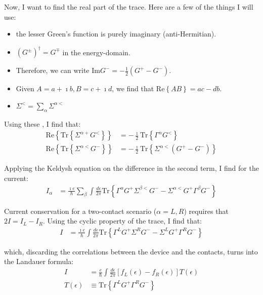 Now, I want to find the real part of the trace. Here are a few of the things I will use:
\begin{itemize}
\item the lesser Green's function is purely imaginary (anti-Hermitian). 
\item $(G^\pm)^\dagger = G^\mp$ in the energy-domain.
\item Therefore, we can write $\text{Im} G^- = - \frac{1}{2} \left( G^+ - G^- \right)$.
\item Given $A=a+\imath b, B = c + \imath d$, we find that $\text{Re}\left\{ AB \right\} = ac - db$.
\item $\Sigma^< = \sum_\alpha \Sigma^{\alpha<}$
\end{itemize}

Using these , I find that:
\begin{align*}
\text{Re}\left\{\text{Tr}\left\{ \Sigma^{\alpha+} G^<\right\}\right\} &= - \frac{\imath}{2} \text{Tr}\left\{ \Gamma^\alpha G^< \right\} \\
\text{Re}\left\{\text{Tr}\left\{ \Sigma^{\alpha<} G^-\right\}\right\} &= - \frac{\imath}{2} \text{Tr}\left\{\Sigma^{\alpha<} \left(G^+ - G^-\right)\right\}
\end{align*}

Applying the Keldysh equation on the difference in the second term, I find for the current:
\begin{align*}
I_\alpha &= \frac{\imath e}{\hbar} \sum_\beta \int \frac{d\epsilon}{2\pi} \text{Tr}\left\{ \Gamma^\alpha G^+ \Sigma^{\beta <}G^- - \Sigma^{\alpha<}G^+\Gamma^\beta G^- \right\}
\end{align*}

Current conservation for a two-contact scenario ($\alpha=L,R$) requires that $2 I = I_L - I_R$. Using the cyclic property of the trace, I find that:
\begin{align*}
I &= \frac{\imath e}{\hbar} \int \frac{d\epsilon}{2\pi} \text{Tr}\left\{ \Gamma^L G^+ \Sigma^R G^- - \Sigma^L G^+ \Gamma^R G^-\right\}
\end{align*}

which, discarding the correlations between the device and the contacts, turns into the Landauer formula:
\begin{align}
I &= \frac{e}{\hbar} \int \frac{d\epsilon}{2\pi} \left[ f_L(\epsilon) - f_R(\epsilon)\right] T(\epsilon) \label{eq:landauer}\\
T(\epsilon)&\equiv \text{Tr}\left\{ \Gamma^L G^+ \Gamma^R G^-\right\}
\end{align}

